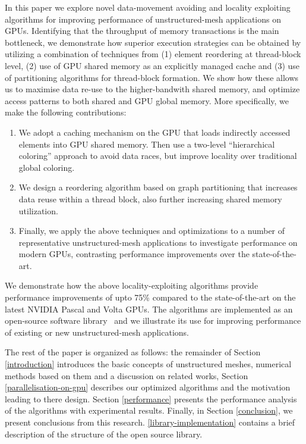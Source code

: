 In this paper we explore novel data-movement avoiding and locality exploiting 
algorithms for improving performance of unstructured-mesh applications on GPUs. 
Identifying that the throughput of memory transactions is the main bottleneck, 
we demonstrate how superior execution strategies can be obtained by utilizing 
a combination of techniques from (1) element reordering at thread-block level, 
(2) use of GPU shared memory as an explicitly managed cache and (3) use of 
partitioning algorithms for thread-block formation. We show how these allows us 
to maximise data re-use to the higher-bandwith shared memory, and optimize 
access patterns to both shared and GPU global memory. More specifically, we make 
the following contributions:
\begin{enumerate}
\item We adopt a caching mechanism on the GPU that loads indirectly accessed 
elements into GPU shared memory. Then use a two-level ``hierarchical coloring'' 
approach to avoid data races, but improve locality over traditional global 
coloring. 

\item We design a reordering algorithm based on graph partitioning that 
increases data reuse within a thread block, also further increasing shared 
memory utilization. 

\item Finally, we apply the above techniques and optimizations to a number of 
representative unstructured-mesh applications to investigate performance on 
modern GPUs, contrasting performance improvements over the state-of-the-art. 
\end{enumerate}

\noindent We demonstrate how the above locality-exploiting algorithms provide 
performance improvements of upto 75\% compared to the state-of-the-art on the 
latest NVIDIA Pascal and Volta GPUs. The algorithms are implemented as an 
open-source software library~\cite{opt-library} and we illustrate 
its use for improving performance of existing or new unstructured-mesh 
applications.

The rest of the paper is organized as follows: the remainder of Section
\ref{introduction} introduces the basic concepts of unstructured meshes, 
numerical methods based on them and a discussion on related works, Section 
\ref{parallelisation-on-gpu} describes our optimized algorithms and the 
motivation leading to there design. Section \ref{performance} presents the 
performance analysis of the algorithms with experimental results. Finally, in 
Section \ref{conclusion}, we present conclusions from this research. 
\ref{library-implementation} contains a brief description of the structure of 
the open source library.



